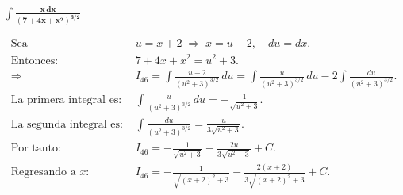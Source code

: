 $\displaystyle \mathbf{\int \frac{x\,dx}{(7+4x+x^{2})^{3/2}}}$

\nopagebreak
$$
\begin{aligned}
\text{Sea } &u = x + 2 \;\Rightarrow\; x = u - 2,\quad du = dx. \\[4pt]
\text{Entonces: } &7 + 4x + x^{2} = u^{2} + 3. \\[4pt]
\Rightarrow &
I_{46} = \int \frac{u - 2}{(u^{2}+3)^{3/2}}\,du
= \int \frac{u}{(u^{2}+3)^{3/2}}\,du - 2\int \frac{du}{(u^{2}+3)^{3/2}}. \\[6pt]
\text{La primera integral es: } &
\int \frac{u}{(u^{2}+3)^{3/2}}\,du = -\frac{1}{\sqrt{u^{2}+3}}. \\[4pt]
\text{La segunda integral es: } &
\int \frac{du}{(u^{2}+3)^{3/2}} = \frac{u}{3\sqrt{u^{2}+3}}. \\[6pt]
\text{Por tanto: } &
I_{46} = -\frac{1}{\sqrt{u^{2}+3}} - \frac{2u}{3\sqrt{u^{2}+3}} + C. \\[4pt]
\text{Regresando a } x: &
\boxed{\displaystyle I_{46}
= -\frac{1}{\sqrt{(x+2)^{2}+3}} - \frac{2(x+2)}{3\sqrt{(x+2)^{2}+3}} + C.}
\end{aligned}
$$
